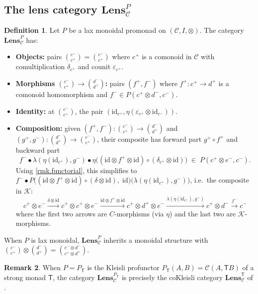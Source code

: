 \documentclass[11pt]{article}
\theoremstyle{definition}
\newtheorem{definition}{Definition}[section]
\newtheorem{remark}[definition]{Remark}
\newcommand{\id}{\mathrm{id}}
\newcommand{\outp}[1]{#1^{+}}
\newcommand{\inpt}[1]{#1^{-}}
\newcommand{\lensob}[1]{\binom{\inpt{#1}}{\outp{#1}}}
\newcommand{\cat}[1]{\mathcal{#1}}
\newcommand{\Cat}[1]{\mathbf{#1}}
\newcommand{\Fun}[1]{\textsf{#1}}
\newcommand{\Lens}[1]{\Cat{Lens}_{#1}}
\newcommand{\LensP}[2]{\Cat{Lens}_{#1}^{#2}}
\newcommand{\To}[1]{\xrightarrow{#1}}
\begin{document}
\subsection{The lens category $\LensP{\cat{C}}{P}$}

\begin{definition}\label{def.lensP}
Let $P$ be a lax monoidal promonad on $(\cat{C},I,\otimes)$. The category $\LensP{\cat{C}}{P}$ has:
\begin{itemize}
\item \textbf{Objects:} pairs $\lensob{c}=\binom{\inpt{c}}{\outp{c}}$ where $\outp{c}$ is a comonoid in $\cat{C}$ with comultiplication $\delta_{\outp{c}}$ and counit $\varepsilon_{\outp{c}}$.
\item \textbf{Morphisms $\lensob{c}\to\lensob{d}$:} pairs $(\outp{f},\inpt{f})$ where $\outp{f}\colon\outp{c}\to\outp{d}$ is a comonoid homomorphism and $\inpt{f}\in P(\outp{c}\otimes\inpt{d},\inpt{c})$.
\item \textbf{Identity:} at $\lensob{c}$, the pair $(\id_{\outp{c}},\eta(\varepsilon_{\outp{c}}\otimes\id_{\inpt{c}}))$.
\item \textbf{Composition:} given $(\outp{f},\inpt{f})\colon\lensob{c}\to\lensob{d}$ and $(\outp{g},\inpt{g})\colon\lensob{d}\to\lensob{e}$, their composite has forward part $\outp{g}\circ\outp{f}$ and backward part
\begin{equation}\label{eqn.lens_compose}
\inpt{f}\bullet\lambda(\eta(\id_{\outp{c}}),\inpt{g})\bullet\eta\bigl((\id\otimes\outp{f}\otimes\id)\circ(\delta_{\outp{c}}\otimes\id)\bigr)\;\in\;P(\outp{c}\otimes\inpt{e},\inpt{c}).
\end{equation}
Using \cref{rmk.functorial}, this simplifies to $\inpt{f}\bullet P\bigl((\id\otimes\outp{f}\otimes\id)\circ(\delta\otimes\id),\;\id\bigr)\bigl(\lambda(\eta(\id_{\outp{c}}),\inpt{g})\bigr)$, i.e.\ the composite in $\cat{K}$:
\[
\outp{c}\otimes\inpt{e}\To{\delta\otimes\id}\outp{c}\otimes\outp{c}\otimes\inpt{e}\To{\id\otimes\outp{f}\otimes\id}\outp{c}\otimes\outp{d}\otimes\inpt{e}\To{\lambda(\eta(\id_{\outp{c}}),\inpt{g})}\outp{c}\otimes\inpt{d}\To{\inpt{f}}\inpt{c}
\]
where the first two arrows are $C$-morphisms (via $\eta$) and the last two are $\cat{K}$-morphisms.
\end{itemize}
When $P$ is lax monoidal, $\LensP{\cat{C}}{P}$ inherits a monoidal structure with $\lensob{c}\otimes\lensob{d}=\binom{\inpt{c}\otimes\inpt{d}}{\outp{c}\otimes\outp{d}}$.
\end{definition}

\begin{remark}
When $P=P_{\Fun{T}}$ is the Kleisli profunctor $P_{\Fun{T}}(A,B)=\cat{C}(A,\Fun{T}B)$ of a strong monad $\Fun{T}$, the category $\LensP{\cat{C}}{P_{\Fun{T}}}$ is precisely the coKleisli category $\Lens{\cat{C}}^{\Fun{T}}$ of \cite[Prop.~3.7]{dynamic-algebra-potentials}.
\end{remark}
\end{document}
